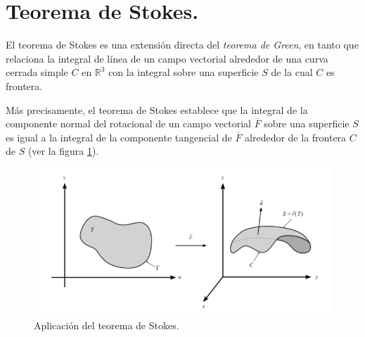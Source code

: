 \section{Teorema de Stokes.}
El teorema de Stokes es una extensión directa del \emph{teorema de Green}, en tanto que relaciona la integral de línea de un campo vectorial alrededor de una curva cerrada simple $C$ en $\mathbb{R}^{3}$ con la integral sobre una superficie $S$ de la cual $C$ es frontera.
\par
Más precisamente, el teorema de Stokes establece que la integral de la componente normal del rotacional de un campo vectorial $\overline{F}$ sobre una superficie $S$ es igual a la integral de la componente tangencial de $\overline{F}$ alrededor de la frontera $C$ de $S$ (ver la figura \ref{fig:figura_01}).
\begin{figure}[H]
    \centering
    \includegraphics[scale=0.7]{Imagenes/Teoremas_Integrales_01.png}
    \caption{Aplicación del teorema de Stokes.}
    \label{fig:figura_01}
\end{figure}
